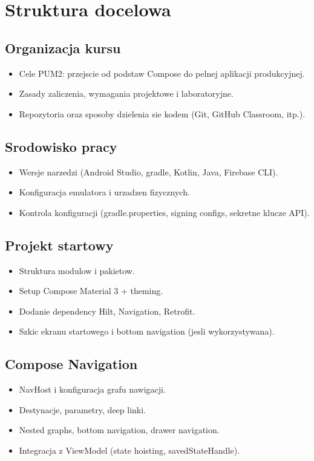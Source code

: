 \section{Struktura docelowa}
\subsection{Organizacja kursu}
\begin{itemize}
  \item Cele PUM2: przejscie od podstaw Compose do pelnej aplikacji produkcyjnej.
  \item Zasady zaliczenia, wymagania projektowe i laboratoryjne.
  \item Repozytoria oraz sposoby dzielenia sie kodem (Git, GitHub Classroom, itp.).
\end{itemize}

\subsection{Srodowisko pracy}
\begin{itemize}
  \item Wersje narzedzi (Android Studio, gradle, Kotlin, Java, Firebase CLI).
  \item Konfiguracja emulatora i urzadzen fizycznych.
  \item Kontrola konfiguracji (gradle.properties, signing configs, sekretne klucze API).
\end{itemize}

\subsection{Projekt startowy}
\begin{itemize}
  \item Struktura modulow i pakietow.
  \item Setup Compose Material 3 + theming.
  \item Dodanie dependency Hilt, Navigation, Retrofit.
  \item Szkic ekranu startowego i bottom navigation (jesli wykorzystywana).
\end{itemize}

\subsection{Compose Navigation}
\begin{itemize}
  \item NavHost i konfiguracja grafu nawigacji.
  \item Destynacje, parametry, deep linki.
  \item Nested graphs, bottom navigation, drawer navigation.
  \item Integracja z ViewModel (state hoisting, savedStateHandle).
\end{itemize}

